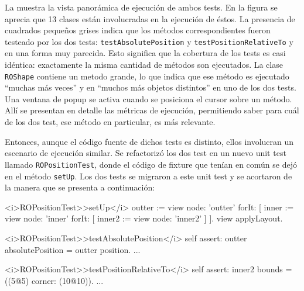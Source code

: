 \vspace*{0.3cm}


\par La  muestra la vista panorámica de ejecución de ambos tests. En la figura se aprecia que 13 clases están involucradas en la ejecución de éstos. La presencia de cuadrados pequeños grises indica que los métodos correspondientes fueron testeado por los dos tests: {\tt testAbsolutePosition} y {\tt testPositionRelativeTo} y en una forma muy parecida. Esto significa que la cobertura de los tests es casi idéntica: exactamente la misma cantidad de métodos son ejecutados. La clase {\tt ROShape} contiene un metodo grande, lo que indica que ese método es ejecutado  ``muchas más veces'' y en ``muchos más objetos distintos'' en uno de los dos tests. Una ventana de popup se activa cuando se posiciona el cursor sobre un método. Allí se presentan en detalle las métricas de ejecución, permitiendo saber para cuál de los dos test, ese método en particular, es más relevante.


\par Entonces, aunque el código fuente de dichos tests es distinto, ellos involucran un escenario de ejecución similar. Se refactorizó los dos test en un nuevo unit test llamado {\tt ROPositionTest}, donde el código de fixture que tenían en común se dejó en el método {\tt setUp}. Los dos tests se migraron a este unit test y se acortaron de la manera que se presenta a continuación:


\begin{codeWithLineNumbers}
<i>ROPositionTest>>setUp</i>
	outter := view node: 'outter' forIt: [
		inner := view node: 'inner' forIt: [
			inner2 := view node: 'inner2'
		]
	].
	view applyLayout.	
	
<i>ROPositionTest>>testAbsolutePosition</i>
	self assert: outter absolutePosition = outter position.
	...
		
<i>ROPositionTest>>testPositionRelativeTo</i>
	self assert: inner2 bounds = ((5@5) corner: (10@10)).
	...
\end{codeWithLineNumbers}

